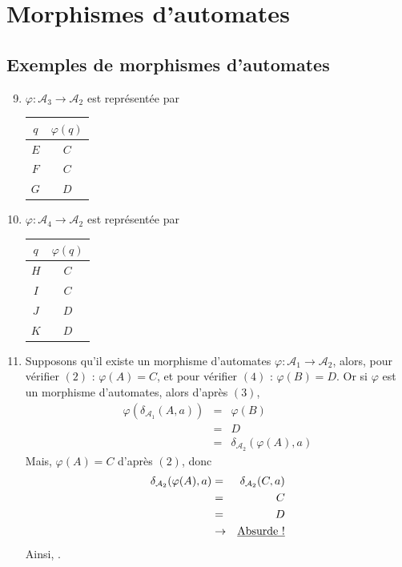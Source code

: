 \documentclass{article}
\begin{document}
\section{Morphismes d'automates}

\subsection{Exemples de morphismes d'automates}

\begin{enumerate}
    \setcounter{enumi}{8}

    \item $\varphi : \mathcal{A}_3 \rightarrow \mathcal{A}_2$ est représentée par \begin{tabular}{|c|c|}
        \hline
        $q$ & $\varphi(q)$ \\
        \hline
        $E$ & $C$ \\
        \hline
        $F$ & $C$ \\
        \hline
        $G$ & $D$ \\
        \hline
    \end{tabular}

    \item $\varphi : \mathcal{A}_4 \rightarrow \mathcal{A}_2$ est représentée par \begin{tabular}{|c|c|}
        \hline
        $q$ & $\varphi(q)$ \\
        \hline
        $H$ & $C$ \\
        \hline
        $I$ & $C$ \\
        \hline
        $J$ & $D$ \\
        \hline
        $K$ & $D$ \\
        \hline
    \end{tabular}

    \item Supposons qu'il existe un morphisme d'automates $\varphi  : \mathcal{A}_1 \rightarrow \mathcal{A}_2$, alors, pour vérifier $(2)$ : $\varphi(A) = C$, et pour vérifier $(4)$ : $\varphi(B) = D$. Or si $\varphi$ est un morphisme d'automates, alors d'après $(3)$,
    \begin{eqnarray*}
        \varphi(\delta_{\mathcal{A}_1}(A, a)) & = & \varphi(B) \\
        & = & D \\
        & = & \delta_{\mathcal{A}_2}(\varphi(A), a)
    \end{eqnarray*}
    Mais, $\varphi(A) = C$ d'après $(2)$, donc 
    \begin{eqnarray*}
        \delta_{\mathcal{A}_2}(\varphi(A), a) & = & \delta_{\mathcal{A}_2}(C, a) \\
        & = & C \\
        & = & D \\ 
        & \rightarrow & \text{\underline{Absurde !}}
    \end{eqnarray*}
    Ainsi, .


\end{enumerate}
\end{document}
